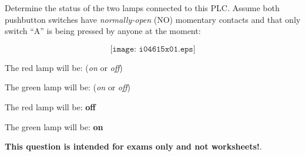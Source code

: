 

Determine the status of the two lamps connected to this PLC.  Assume both pushbutton switches have {\it normally-open} (NO) momentary contacts and that only switch ``A'' is being pressed by anyone at the moment:

$$\texttt{[image: i04615x01.eps]}$$

\vskip 10pt

The red lamp will be: ({\it on} or {\it off})

\vskip 10pt

The green lamp will be: ({\it on} or {\it off})







The red lamp will be: {\bf off}

\vskip 10pt

The green lamp will be: {\bf on}







{\bf This question is intended for exams only and not worksheets!}.



